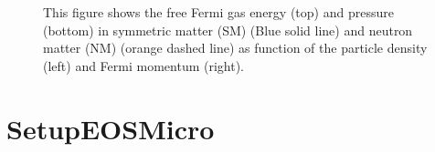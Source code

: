\documentclass[letterpaper,10pt,english]{sphinxmanual}
\begin{document}
\begin{figure}[htbp]
\centering
\capstart

\noindent{}
\caption{This figure shows the free Fermi gas energy (top) and pressure (bottom) in symmetric matter (SM) (Blue solid line) and neutron matter (NM) (orange dashed line) as function of the particle density (left) and Fermi momentum (right).}\label{\detokenize{source/api/setup_eos_ffg:id1}}\end{figure}

\sphinxstepscope


\section{SetupEOSMicro}
\label{\detokenize{source/api/setup_eos_micro:setupeosmicro}}\label{\detokenize{source/api/setup_eos_micro::doc}}\label{\detokenize{source/api/setup_eos_micro:module-nucleardatapy.eos.setup_micro}}
\end{document}
